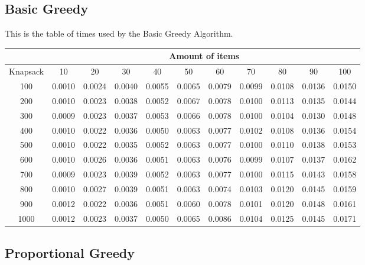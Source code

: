 \documentclass{report}
\begin{document}
\newpage
\subsection*{Basic Greedy}

This is the table of times used by the Basic Greedy Algorithm. 
\begin{table}[H]
\hspace{-3cm}
\begin{tabular}{|c|c|c|c|c|c|c|c|c|c|c|}
\hline
& \multicolumn{10}{c|}{Amount of items} \\
\hline
Knapsack & 10 & 20 & 30 & 40 & 50 & 60 & 70 & 80 & 90 & 100 \\
\hline
100 & 0.0010 & 0.0024 & 0.0040 & 0.0055 & 0.0065 & 0.0079 & 0.0099 & 0.0108 & 0.0136 & 0.0150\\ 
\hline
200 & 0.0010 & 0.0023 & 0.0038 & 0.0052 & 0.0067 & 0.0078 & 0.0100 & 0.0113 & 0.0135 & 0.0144\\ 
\hline
300 & 0.0009 & 0.0023 & 0.0037 & 0.0053 & 0.0066 & 0.0078 & 0.0100 & 0.0104 & 0.0130 & 0.0148\\ 
\hline
400 & 0.0010 & 0.0022 & 0.0036 & 0.0050 & 0.0063 & 0.0077 & 0.0102 & 0.0108 & 0.0136 & 0.0154\\ 
\hline
500 & 0.0010 & 0.0022 & 0.0035 & 0.0052 & 0.0063 & 0.0077 & 0.0100 & 0.0110 & 0.0138 & 0.0153\\ 
\hline
600 & 0.0010 & 0.0026 & 0.0036 & 0.0051 & 0.0063 & 0.0076 & 0.0099 & 0.0107 & 0.0137 & 0.0162\\ 
\hline
700 & 0.0009 & 0.0023 & 0.0039 & 0.0052 & 0.0063 & 0.0077 & 0.0100 & 0.0115 & 0.0143 & 0.0158\\ 
\hline
800 & 0.0010 & 0.0027 & 0.0039 & 0.0051 & 0.0063 & 0.0074 & 0.0103 & 0.0120 & 0.0145 & 0.0159\\ 
\hline
900 & 0.0012 & 0.0022 & 0.0036 & 0.0051 & 0.0060 & 0.0078 & 0.0101 & 0.0120 & 0.0148 & 0.0161\\ 
\hline
1000 & 0.0012 & 0.0023 & 0.0037 & 0.0050 & 0.0065 & 0.0086 & 0.0104 & 0.0125 & 0.0145 & 0.0171\\ 
\hline
\end{tabular}
\end{table}

\subsection*{Proportional Greedy}
\end{document}
